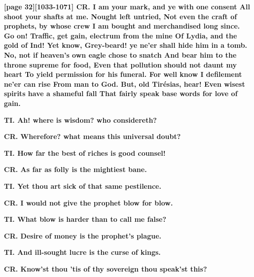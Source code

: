 \documentclass[11pt,letter]{book}
\begin{document}
\par \textbf{[page 32][1033-1071] CR. I am your mark, and ye with one consent All shoot your shafts at me. Nought left untried, Not even the craft of prophets, by whose crew I am bought and merchandised long since. Go on! Traffic, get gain, electrum from the mine Of Lydia, and the gold of Ind! Yet know, Grey-beard! ye ne’er shall hide him in a tomb. No, not if heaven’s own eagle chose to snatch And bear him to the throne supreme for food, Even that pollution should not daunt my heart To yield permission for his funeral. For well know I defilement ne’er can rise From man to God. But, old Tirésias, hear! Even wisest spirits have a shameful fall That fairly speak base words for love of gain.}
\par 

\par \textbf{TI. Ah! where is wisdom? who considereth?}
\par 

\par \textbf{CR. Wherefore? what means this universal doubt?}
\par 

\par \textbf{TI. How far the best of riches is good counsel!}
\par 

\par \textbf{CR. As far as folly is the mightiest bane.}
\par 

\par \textbf{TI. Yet thou art sick of that same pestilence.}
\par 

\par \textbf{CR. I would not give the prophet blow for blow.}
\par 

\par \textbf{TI. What blow is harder than to call me false?}
\par 

\par \textbf{CR. Desire of money is the prophet’s plague.}
\par 

\par \textbf{TI. And ill-sought lucre is the curse of kings.}
\par 

\par \textbf{CR. Know’st thou ’tis of thy sovereign thou speak’st this?}
\par 
\end{document}
